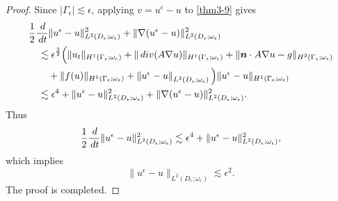 \documentclass[10pt,a4paper]{amsart}
\newcommand{\dd}{\,{\rm d}}
\newcommand{\divo}{\,{\rm div}}
\begin{document}
\begin{proof}
	Since $|\Gamma_{\epsilon}|\lesssim \epsilon$, applying $v=u^{\epsilon}-u$ to \eqref{thm3-9} gives
	\begin{equation}
		\begin{aligned}
			\label{thm3-11}
			&\frac 1 2\frac{\dd}{\dd t}\|u^{\epsilon}-u\|_{L^2(D_{\epsilon};\omega_{\epsilon})}^2+\|\nabla(u^{\epsilon}-u)\|_{L^2(D_{\epsilon};\omega_{\epsilon})}^2\\
			&\quad\lesssim \epsilon^{\frac 3 2}\Big(\|u_t\|_{H^1(\Gamma_{\epsilon};\omega_{\epsilon})}+\|\divo(A\nabla u)\|_{H^1(\Gamma_{\epsilon};\omega_{\epsilon})}+\|\bm n\cdot A\nabla u-g\|_{H^2(\Gamma_{\epsilon};\omega_{\epsilon})}\\
			&\qquad+\|f(u)\|_{H^1(\Gamma_{\epsilon};\omega_{\epsilon})}+\left\|u^{\epsilon}-u\right\|_{L^2(D_{\epsilon};\omega_{\epsilon})}\Big)\|u^{\epsilon}-u\|_{H^1(\Gamma_{\epsilon};\omega_{\epsilon})}\\
			&\quad\lesssim  \epsilon^4 +\|u^{\epsilon}-u\|_{L^2(D_{\epsilon};\omega_{\epsilon})}^2+\|\nabla(u^{\epsilon}-u)\|_{L^2(D_{\epsilon};\omega_{\epsilon})}^2.
		\end{aligned}
	\end{equation}
	Thus
	\begin{equation*}
		\frac 1 2\frac{\dd}{\dd t}\|u^{\epsilon}-u\|_{L^2(D_{\epsilon};\omega_{\epsilon})}^2 \lesssim \epsilon^4+\|u^{\epsilon}-u\|_{L^2(D_{\epsilon};\omega_{\epsilon})}^2,
	\end{equation*}
	which implies 
	\begin{equation*}
		\|u^{\epsilon}-u\|_{L^2(D_{\epsilon};\omega_{\epsilon})}\lesssim \epsilon^2.
	\end{equation*}
	The proof is completed.
	
\end{proof}
\end{document}

